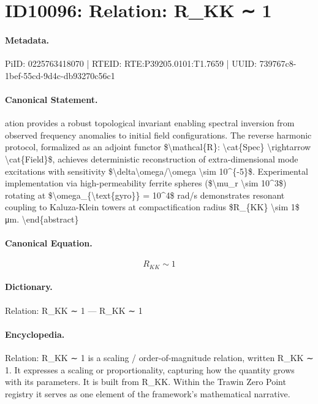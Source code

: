 \section*{ID10096: Relation: R\_KK ∼ 1}
\paragraph{Metadata.}
PiID: 0225763418070 | RTEID: RTE:P39205.0101:T1.7659 | UUID: 739767c8-1bef-55cd-9d4c-db93270c56c1

\paragraph{Canonical Statement.}
ation provides a robust topological invariant enabling spectral inversion from observed frequency anomalies to initial field configurations. The reverse harmonic protocol, formalized as an adjoint functor \$\textbackslash{}mathcal\{R\}: \textbackslash{}cat\{Spec\} \textbackslash{}rightarrow \textbackslash{}cat\{Field\}\$, achieves deterministic reconstruction of extra-dimensional mode excitations with sensitivity \$\textbackslash{}delta\textbackslash{}omega/\textbackslash{}omega \textbackslash{}sim 10\textasciicircum{}\{-5\}\$. Experimental implementation via high-permeability ferrite spheres (\$\textbackslash{}mu\_r \textbackslash{}sim 10\textasciicircum{}3\$) rotating at \$\textbackslash{}omega\_\{\textbackslash{}text\{gyro\}\} = 10\textasciicircum{}4\$ rad/s demonstrates resonant coupling to Kaluza-Klein towers at compactification radius \$R\_\{KK\} \textbackslash{}sim 1\$ μm. \textbackslash{}end\{abstract\}

\paragraph{Canonical Equation.}
\[
R_{KK} \sim 1
\]

\paragraph{Dictionary.}
Relation: R\_KK ∼ 1 — R\_KK ∼ 1

\paragraph{Encyclopedia.}
Relation: R\_KK ∼ 1 is a scaling / order-of-magnitude relation, written R\_KK ∼ 1. It expresses a scaling or proportionality, capturing how the quantity grows with its parameters. It is built from R\_KK. Within the Trawin Zero Point registry it serves as one element of the framework's mathematical narrative.
